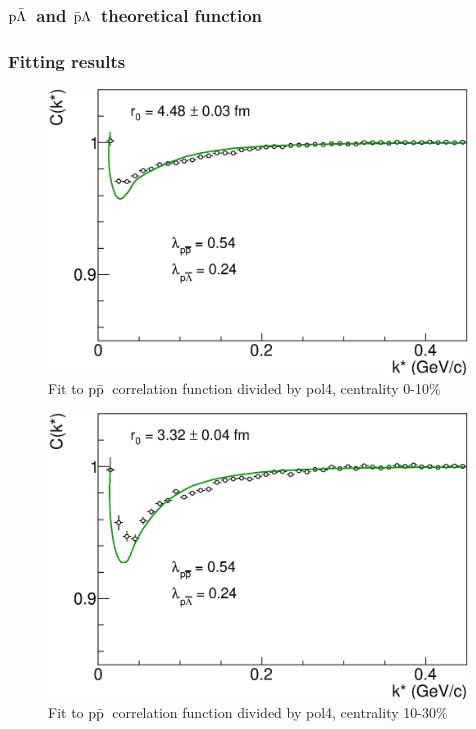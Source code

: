 \documentclass[ALICE,manyauthors]{ALICE_analysis_notes}
\newcommand{\pap}{$\rm p\bar{\rm p}$}
\newcommand{\pal}{$\rm p\bar{\rm \Lambda}$}
\newcommand{\apl}{$\bar{\rm p }\Lambda$}
\begin{document}
\subsubsection{\pal~and \apl~theoretical function}

\subsubsection{Fitting results}

\begin{figure}[]
   \centering
   \includegraphics[width=0.99\textwidth]{pics/divp4NumOutPckstarPAPtpcM0Psi3_fitpap0.eps}
   \caption{Fit to \pap~correlation function divided by pol4, centrality 0-10$\%$}
   \label{fig:fitpap0}
 \end{figure}

\begin{figure}[]
   \centering
   \includegraphics[width=0.99\textwidth]{pics/divp4NumOutPckstarPAPtpcM2Psi3_fitpap1.eps}
   \caption{Fit to \pap~correlation function divided by pol4, centrality 10-30$\%$}
   \label{fig:fitpap1}
 \end{figure}
\end{document}
